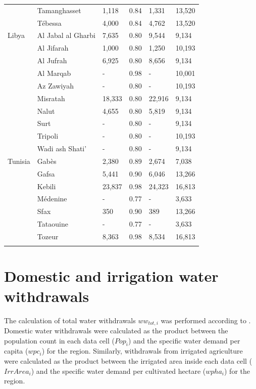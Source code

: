 \documentclass[12pt]{iopart}
\begin{document}
{\begin{longtable}{@{}l l P{0.9in} P{0.9in} P{1in} P{0.8in}}
			& Tamanghasset       & 1,118  & 0.84 & 1,331  & 13,520 \\
			& T\'ebessa            & 4,000  & 0.84 & 4,762  & 13,520 \\\ms
	Libya   & Al Jabal al Gharbi & 7,635  & 0.80 & 9,544  & 9,134  \\
			& Al Jifarah         & 1,000  & 0.80 & 1,250  & 10,193 \\
			& Al Jufrah          & 6,925  & 0.80 & 8,656  & 9,134  \\
			& Al Marqab          & -      & 0.98 & -      & 10,001 \\
			& Az Zawiyah         & -      & 0.80 & -      & 10,193 \\
			& Misratah           & 18,333 & 0.80 & 22,916 & 9,134  \\
			& Nalut              & 4,655  & 0.80 & 5,819  & 9,134  \\
			& Surt               & -      & 0.80 & -      & 9,134  \\
			& Tripoli            & -      & 0.80 & -      & 10,193 \\
			& Wadi ash Shati'    & -      & 0.80 & -      & 9,134  \\\ms
	Tunisia & Gabès              & 2,380  & 0.89 & 2,674  & 7,038  \\
			& Gafsa              & 5,441  & 0.90 & 6,046  & 13,266 \\
			& Kebili             & 23,837 & 0.98 & 24,323 & 16,813 \\
			& Médenine           & -      & 0.77 & -      & 3,633  \\
			& Sfax               & 350    & 0.90 & 389    & 13,266 \\
			& Tataouine          & -      & 0.77 & -      & 3,633  \\
			& Tozeur             & 8,363  & 0.98 & 8,534  & 16,813 \\
	\br
\end{longtable}
}

\vfill
\section{Domestic and irrigation water withdrawals}
The calculation of total water withdrawals $ww_{tot,i}$ was performed according to . Domestic water withdrawals were calculated as the product between the population count in each data cell ($Pop_{i}$) and the specific water demand per capita ($wpc_{i}$) for the region. Similarly, withdrawals from irrigated agriculture were calculated as the product between the irrigated area inside each data cell ($IrrArea_{i}$) and the specific water demand per cultivated hectare ($wpha_{i}$) for the region.
\end{document}

